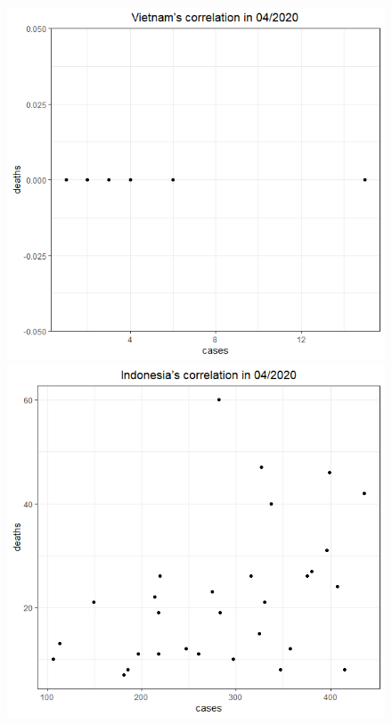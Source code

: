 \documentclass[a4paper]{article}
\theoremstyle{definition}
\begin{document}
\begin{enumerate}[1)]
\begin{figure}[H]
\begin{center}
        \includegraphics[scale = 0.3]{ix/ix.2/VN_04_2020.png}
        \includegraphics[scale = 0.3]{ix/ix.2/IDN_04_2020.png}

\end{center}
\end{figure}
\end{enumerate}
\end{document}
